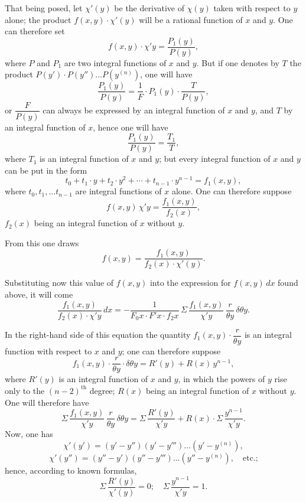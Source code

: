 \documentclass{article}
\begin{document}
That being posed, let $\chi'(y)$ be the derivative of $\chi(y)$ taken with respect to $y$ alone; the product $f(x, y) \cdot \chi'(y)$ will be a rational function of $x$ and $y$. One can therefore set
\[ f(x, y) \cdot \chi' y = \frac{P_1(y)}{P(y)}, \]
where $P$ and $P_1$ are two integral functions of $x$ and $y$. But if one denotes by $T$ the product $P(y') \cdot P(y'') \ldots P(y^{(n)})$, one will have
\[ \frac{P_1(y)}{P(y)} = \frac{1}{F} \cdot P_1(y) \cdot \frac{T}{P(y)}, \]
or $\dfrac{F}{P(y)}$ can always be expressed by an integral function of $x$ and $y$, and $T$ by an integral function of $x$, hence one will have
\[ \frac{P_1(y)}{P(y)} = \frac{T_1}{T}, \]
where $T_1$ is an integral function of $x$ and $y$; but every integral function of $x$ and $y$ can be put in the form
\[ t_0 + t_1 \cdot y + t_2 \cdot y^{2} + \cdots + t_{n-1} \cdot y^{n-1} = f_1(x, y), \tag{16} \]
where $t_0, t_1, \ldots t_{n-1}$ are integral functions of $x$ alone. One can therefore suppose
\[ f(x, y)\,\chi' y = \frac{f_1(x, y)}{f_2(x)}, \]
$f_2(x)$ being an integral function of $x$ without $y$.

From this one draws
\[ f(x, y) = \frac{f_1(x, y)}{f_2(x) \cdot \chi'(y)}. \tag{17} \]

Substituting now this value of $f(x, y)$ into the expression for $f(x, y)\,dx$ found above, it will come
\[ \frac{f_1(x, y)}{f_2(x) \cdot \chi' y}\,dx = -\frac{1}{F_0 x \cdot F' x \cdot f_2 x}\,\Sigma\,\frac{f_1(x, y)}{\chi' y}\,\frac{r}{\theta y}\,\delta\theta y. \tag{18} \]

In the right-hand side of this equation the quantity $f_1(x, y) \cdot \dfrac{r}{\theta y}$ is an integral function with respect to $x$ and $y$; one can therefore suppose
\[ f_1(x, y) \cdot \frac{r}{\theta y} \cdot \delta\theta y = R'(y) + R(x)\,y^{n-1}, \]
where $R'(y)$ is an integral function of $x$ and $y$, in which the powers of $y$ rise only to the $(n-2)^{\text{th}}$ degree; $R(x)$ being an integral function of $x$ without $y$. One will therefore have
\[ \Sigma\,\frac{f_1(x, y)}{\chi' y}\,\frac{r}{\theta y}\,\delta\theta y = \Sigma\,\frac{R'(y)}{\chi' y} + R(x) \cdot \Sigma\,\frac{y^{n-1}}{\chi' y}. \]
Now, one has
\[ \chi'(y') = (y'-y'')(y'-y''') \ldots (y'-y^{(n)}), \]
\[ \chi'(y'') = (y''-y')(y''-y''') \ldots (y''-y^{(n)}), \quad \text{etc.;} \]
hence, according to known formulas,
\[ \Sigma\,\frac{R'(y)}{\chi'(y)} = 0; \quad \Sigma\,\frac{y^{n-1}}{\chi' y} = 1. \]
\end{document}
